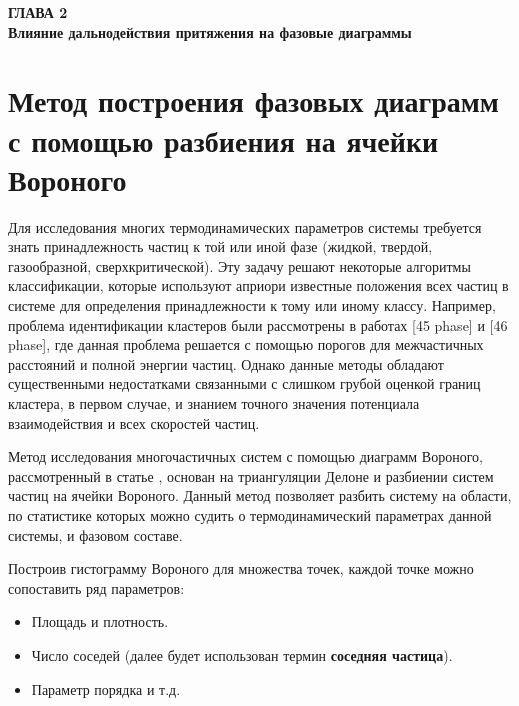 
\newpage
\begin{center}
\textbf{\large ГЛАВА 2 \\ Влияние дальнодействия притяжения на фазовые диаграммы}
\end{center}



\section{Метод построения фазовых диаграмм с помощью разбиения на ячейки Вороного}\label{C2_1}

Для исследования многих термодинамических параметров системы требуется знать принадлежность частиц к той или иной фазе (жидкой, твердой, газообразной, сверхкритической). Эту задачу решают некоторые алгоритмы классификации, которые используют априори известные положения всех частиц в системе для определения принадлежности к тому или иному классу. Например, проблема идентификации кластеров были рассмотрены в работах [45 phase] и [46 phase], где данная проблема решается с помощью порогов для межчастичных расстояний и полной энергии частиц. Однако данные методы обладают существенными недостатками связанными с слишком грубой оценкой границ кластера, в первом случае, и знанием точного значения потенциала взаимодействия и всех скоростей частиц.

Метод исследования многочастичных систем с помощью диаграмм Вороного, рассмотренный в статье \cite{Ovcharov2017}, основан на триангуляции Делоне и разбиении систем частиц на ячейки Вороного. Данный метод позволяет разбить систему на области, по статистике которых можно судить о термодинамический параметрах данной системы, и фазовом составе.

Построив гистограмму Вороного для множества точек, каждой точке можно сопоставить ряд параметров:
\begin{itemize}
\item Площадь и плотность.
\item Число соседей (далее будет использован термин \textbf{соседняя частица}).
\item Параметр порядка и т.д.
\end{itemize}

